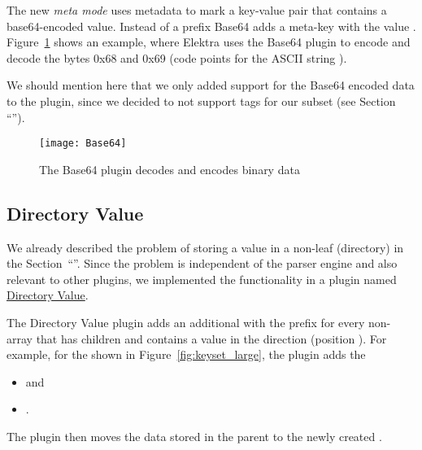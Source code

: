 The new \emph{meta mode} uses metadata to mark a key-value pair that contains a base64-encoded value. Instead of a prefix Base64 adds a meta-key  with the value . Figure~\ref{fig:base64} shows an example, where Elektra uses the Base64 plugin to encode and decode the bytes 0x68 and 0x69 (code points for the ASCII string ).

We should mention here that we only added support for the Base64 encoded data to the \LinkYAMLCPP{} plugin, since we decided to not support tags for our  subset (see Section “”).

\begin{figure}
  \centering
    \texttt{[image: Base64]}
  \caption{The Base64 plugin decodes and encodes binary data}
  \label{fig:base64}
\end{figure}

\subsection{Directory Value}

We already described the problem of storing a value in a non-leaf (directory)  in the Section~“”. Since the problem is independent of the parser engine and also relevant to other plugins, we implemented the functionality in a plugin named \href{http://libelektra.org/plugins/directoryvalue}{Directory Value}.

The Directory Value plugin adds an additional  with the prefix  for every non-array  that has children and contains a value in the  direction (position ). For example, for the  shown in Figure~\ref{fig:keyset_large}, the plugin adds the 

\begin{itemize}
  \item {} and
  \item {}.
\end{itemize}

The plugin then moves the data stored in the parent  to the newly created .

